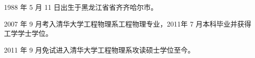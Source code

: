 \begin{resume}


  1988 年 5 月 11 日出生于黑龙江省省齐齐哈尔市。
  
  2007 年 9 月考入清华大学工程物理系工程物理专业，2011年 7 月本科毕业并获得工学学士学位。
  
  2011 年 9 月免试进入清华大学工程物理系攻读硕士学位至今。


  \begin{enumerate}[{[}1{]}]
  \item 
  \end{enumerate}

\end{resume}
